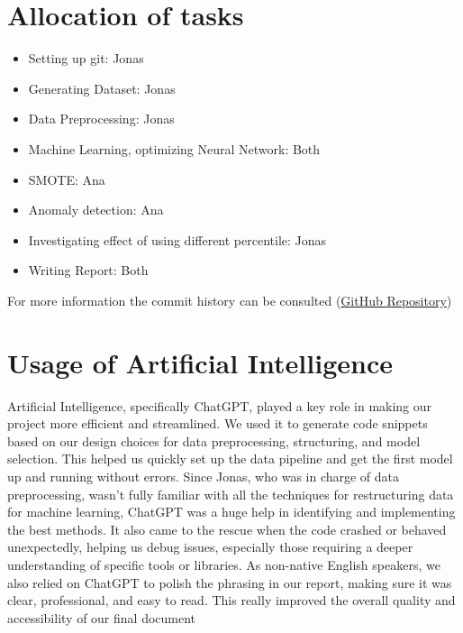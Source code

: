 \documentclass[conference,9pt]{IEEEtran}
\begin{document}
\section{Allocation of tasks}
\begin{itemize}
\item Setting up git: Jonas
\item Generating Dataset: Jonas
\item Data Preprocessing: Jonas
\item Machine Learning, optimizing Neural Network: Both
\item SMOTE: Ana
\item Anomaly detection: Ana
\item Investigating effect of using different percentile: Jonas
\item Writing Report: Both
\end{itemize}
For more information the commit history can be consulted (\href{https://github.com/JonasThalmeier/MALIS_heatForecast}{GitHub Repository})
\section{Usage of Artificial Intelligence}
Artificial Intelligence, specifically ChatGPT, played a key role in making our project more efficient and streamlined. We used it to generate code snippets based on our design choices for data preprocessing, structuring, and model selection. This helped us quickly set up the data pipeline and get the first model up and running without errors. Since Jonas, who was in charge of data preprocessing, wasn’t fully familiar with all the techniques for restructuring data for machine learning, ChatGPT was a huge help in identifying and implementing the best methods. It also came to the rescue when the code crashed or behaved unexpectedly, helping us debug issues, especially those requiring a deeper understanding of specific tools or libraries. As non-native English speakers, we also relied on ChatGPT to polish the phrasing in our report, making sure it was clear, professional, and easy to read. This really improved the overall quality and accessibility of our final document
\end{document}
